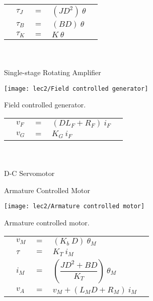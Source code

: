 \begin{tabular}{C{1mm} C{1mm} C{2cm} l l}
			&$\tau_J$& $=$ & $(JD^2)\ \theta$ &\\
			&$\tau_B$& $=$ & $(BD)\ \theta$	&\\
			&$\tau_K$& $=$ & $K\ \theta$&\\
\end{tabular}

\vspace{-1em}
\hspace*{\fill}\\[+2mm]
\\[-1.5em]


Single-stage Rotating Amplifier\\[-1mm]
\begin{marginfigure}[-1em]
		\texttt{[image: lec2/Field controlled generator]}
		\caption{Field controlled generator.}
\end{marginfigure}

\begin{tabular}{C{1mm} C{1mm} C{2cm} l l}
			&$v_F$& $=$ & $(DL_F+R_F)\ i_F$ &\\
			&$v_G$& $=$ & $K_G\ i_F$&\\
\end{tabular}

\vspace{-1em}
\hspace*{\fill}\\[+2mm]
\\[-1.5em]

D-C Servomotor\\[-1mm]

Armature Controlled Motor\\[-1mm]
\begin{marginfigure}[-1em]
		\texttt{[image: lec2/Armature controlled motor]}
		\caption{Armature controlled motor.}
\end{marginfigure}

\begin{tabular}{C{1mm} C{1mm} C{2cm} l l}
			&$v_M$ & $=$ & $(K_b\ D)\ \theta_M$ &\\
			&$\tau$& $=$ & $K_T\ i_M$ &\\
			&$i_M$ & $=$ & $(\dfrac{JD^2+BD}{K_T})\ \theta_M$ &\\
			&$v_A$ & $=$ & $v_M + (L_M D+R_M)\ i_M$ &\\
\end{tabular}

